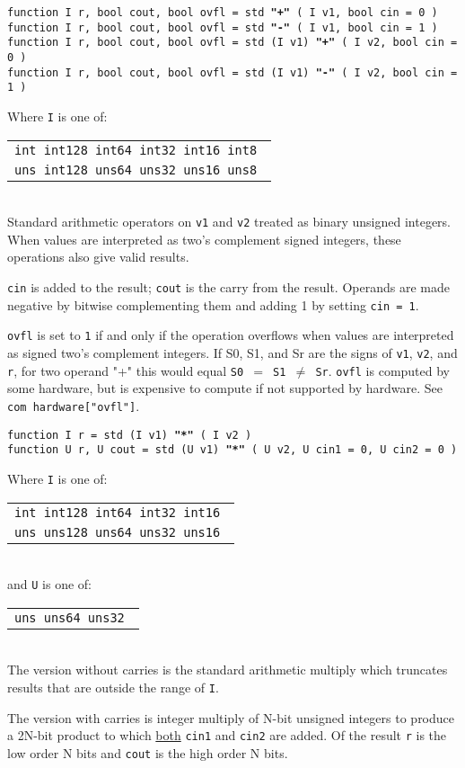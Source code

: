 \documentclass[12pt]{article}
\newcommand{\ttkey}[1]{{\tt \bfseries #1}}
\newenvironment{indpar}[1][0.3in]%
	{\begin{list}{}%
		     {\setlength{\itemsep}{0in}%
		      \setlength{\topsep}{0in}%
		      \setlength{\parsep}{1ex}%
		      \setlength{\labelwidth}{#1}%
		      \setlength{\leftmargin}{#1}%
		      \addtolength{\leftmargin}{\labelsep}}%
	 \item}%
	{\end{list}}
\begin{document}
{\tt function I r, bool cout, bool ovfl =
	std \ttkey{"+"} ( I v1, bool cin = 0 )} \\
{\tt function I r, bool cout, bool ovfl =
	std \ttkey{"-"} ( I v1, bool cin = 1 )} \\
{\tt function I r, bool cout, bool ovfl =
    std (I v1) \ttkey{"+"} ( I v2, bool cin = 0 )} \\
{\tt function I r, bool cout, bool ovfl =
    std (I v1) \ttkey{"-"} ( I v2, bool cin = 1 )}
\begin{indpar}
Where {\tt I} is one of:
	\begin{tabular}[t]{l}
	\tt int  int128 int64  int32  int16  int8 \\
	\tt uns  int128 uns64  uns32  uns16  uns8 \\
	\end{tabular}
\\[1ex]
Standard arithmetic operators on {\tt v1} and {\tt v2}
treated as binary unsigned integers.  When values are
interpreted as two's complement signed integers, these
operations also give valid results.

{\tt cin} is added to the result; {\tt cout} is the carry from
the result.  Operands are made negative by bitwise complementing
them and adding 1 by setting {\tt cin = 1}.

{\tt ovfl} is set to {\tt 1} if and only if the operation overflows
when values are interpreted as signed two's complement integers.
If S0, S1, and Sr are the signs of {\tt v1}, {\tt v2}, and {\tt r},
for two operand "+" this would equal {\tt S0 $=$ S1 $\neq$ Sr}.
{\tt ovfl} is computed by some hardware, but is expensive to
compute if not supported by hardware.  See
{\tt com hardware["ovfl"]}.

\end{indpar}

{\tt function I r = std (I v1) \ttkey{"*"} ( I v2 )} \\
{\tt function U r, U cout =
    std (U v1) \ttkey{"*"} ( U v2, U cin1 = 0, U cin2 = 0 )}
\begin{indpar}
Where {\tt I} is one of:
	\begin{tabular}[t]{l}
	\tt int  int128 int64  int32  int16 \\
	\tt uns  uns128 uns64  uns32  uns16 \\
	\end{tabular}
\\[1ex]
and {\tt U} is one of:
	\begin{tabular}[t]{l}
	\tt uns  uns64  uns32 \\
	\end{tabular}
\\[1ex]
The version without carries is the standard arithmetic multiply
which truncates results that are outside the range of {\tt I}.

The version with carries is integer multiply of N-bit unsigned
integers to produce a 2N-bit product to which \underline{both}
{\tt cin1} and {\tt cin2} are
added.  Of the result {\tt r} is the low order N bits
and {\tt cout} is the high order N bits.

\end{indpar}
\end{document}
